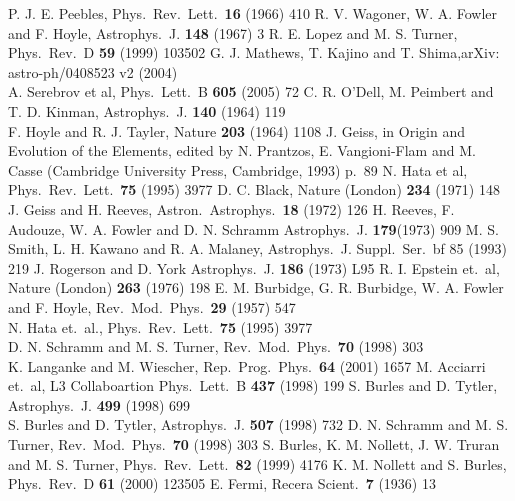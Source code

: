 \begin{thebibliography}{99}
 P. J. E. Peebles, Phys.\ Rev.\ Lett.\ {\bf 16} (1966) 410
 R. V. Wagoner, W. A. Fowler and F. Hoyle, Astrophys.\ J. {\bf 148} (1967) 3 
 R. E. Lopez and M. S. Turner, Phys.\ Rev.\ D {\bf 59} (1999) 103502
 G. J. Mathews, T. Kajino and T. Shima,arXiv: astro-ph/0408523 v2 (2004)\\
A. Serebrov et al, Phys.\ Lett.\ B {\bf 605} (2005) 72
 C. R. O'Dell, M. Peimbert and T. D. Kinman, Astrophys.\ J. {\bf 140} (1964) 119\\ 
F. Hoyle and R. J. Tayler, Nature {\bf 203} (1964) 1108
 J. Geiss, in Origin and Evolution of the Elements, edited by N. Prantzos, E. Vangioni-Flam and M. Casse (Cambridge University Press, Cambridge, 1993) p.\ 89
 N. Hata et al, Phys.\ Rev.\ Lett.\ {\bf 75} (1995) 3977
 D. C. Black, Nature (London) {\bf 234} (1971) 148\\ 
J. Geiss and H. Reeves, Astron.\ Astrophys.\ {\bf 18} (1972) 126
 H. Reeves, F. Audouze, W. A. Fowler and D. N. Schramm Astrophys.\ J. {\bf 179}(1973) 909
 M. S. Smith, L. H. Kawano and R. A. Malaney, Astrophys.\ J. Suppl.\ Ser.\ {bf 85} (1993) 219
 J. Rogerson and D. York Astrophys.\ J. {\bf 186} (1973) L95
 R. I. Epstein et.\ al, Nature (London) {\bf 263} (1976) 198
 E. M. Burbidge, G. R. Burbidge, W. A. Fowler and F. Hoyle, Rev.\ Mod.\ Phys.\ {\bf 29} (1957) 547\\
N. Hata et.\ al., Phys.\ Rev.\ Lett.\ {\bf 75} (1995) 3977\\
D. N. Schramm and M. S. Turner, Rev.\ Mod.\ Phys.\ {\bf 70} (1998) 303\\
K. Langanke and M. Wiescher, Rep.\ Prog.\ Phys.\ {\bf 64} (2001) 1657
 M. Acciarri et.\ al, L3 Collaboartion Phys.\ Lett.\ B {\bf 437} (1998) 199
 S. Burles and D. Tytler, Astrophys.\ J. {\bf 499} (1998) 699\\
S. Burles and D. Tytler, Astrophys.\ J. {\bf 507} (1998) 732
 D. N. Schramm and M. S. Turner, Rev.\ Mod.\ Phys.\ {\bf 70} (1998) 303
 S. Burles, K. M. Nollett, J. W. Truran and M. S. Turner, Phys.\ Rev.\ Lett.\ {\bf 82} (1999) 4176
 K. M. Nollett and S. Burles, Phys.\ Rev.\ D {\bf 61} (2000) 123505
 E. Fermi, Recera Scient.\ {\bf 7} (1936) 13\\

\end{thebibliography}
